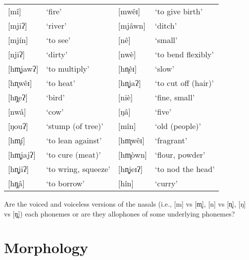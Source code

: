 \documentclass[addpoints]{exam}
\begin{document}
\begin{questions}
        \begin{tabular}{l l l l}
          {[}mî]     & `fire'              & [mwêɪ]  & `to give birth' \\
          {[}mjiʔ]   & `river'             & [mjâwn]  & `ditch' \\
          {[}mjín]   & `to see'            & [nê]     & `small' \\
          {[}njiʔ]   & `dirty'             & [nwè]    & `to bend flexibly' \\
          {[}hm̥jawʔ] & `to multiply'       & [hn̥êɪ]   & `slow' \\
          {[}hn̥wêɪ]  & `to heat'           & [hn̥jaʔ]  & `to cut off (hair)' \\
          {[}hŋ̥eʔ]   & `bird'              & [niè]    & `fine, small' \\
          {[}nwâ]    & `cow'               & [ŋâ]     & `five' \\
          {[}ŋouʔ]   & `stump (of tree)'   & [mîn]    & `old (people)' \\
          {[}hm̥í]    & `to lean against'   & [hm̥wêɪ]  & `fragrant' \\
          {[}hm̥jajʔ] & `to cure (meat)'    & [hm̥òwn]  & `flour, powder' \\
          {[}hn̥jiʔ]  & `to wring, squeeze' & [hn̥jeɪʔ] & `to nod the head' \\
          {[}hŋ̥â]    & `to borrow'         & [hîn]    & `curry'
        \end{tabular}

        \question[1] Are the voiced and voiceless versions of the nasals (i.e., [m] vs [m̥], [n] vs [n̥], [ŋ] vs [ŋ̥]) each phonemes or are they allophones of some underlying phonemes? \hrulefill

    \section{Morphology}


\end{questions}
\end{document}

